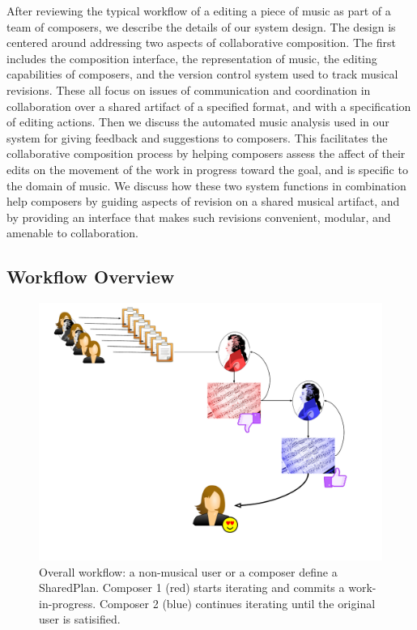 \documentclass[final,authoryear,5p,times,twocolumn]{elsarticle}
\begin{document}
After reviewing the typical workflow of a editing a piece of music as part of a team of composers, we describe the details of our system design. The design is centered around addressing two aspects of collaborative composition. The first includes the composition interface, the representation of music, the editing capabilities of composers, and the version control system used to track musical revisions. These all focus on issues of communication and coordination in collaboration over a shared artifact of a specified format, and with a specification of editing actions. Then we discuss the automated music analysis used in our system for giving feedback and suggestions to composers. This facilitates the collaborative composition process by helping composers assess the affect of their edits on the movement of the work in progress toward the goal, and is specific to the domain of music. We discuss how these two system functions in combination help composers by guiding aspects of revision on a shared musical artifact, and by providing an interface that makes such revisions convenient, modular, and amenable to collaboration.

\subsection{Workflow Overview}

\begin{figure}
	\includegraphics[scale=0.35]{workflow.pdf}
	\caption{Overall workflow: a non-musical user or a composer define a SharedPlan. Composer 1 (red) starts
	iterating and commits a work-in-progress. Composer 2 (blue) continues iterating until the original user is
	satisified.}
	\label{fig:workflow}
\end{figure}
\end{document}

